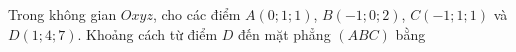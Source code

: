 \begin{ex}
Trong không gian $Oxyz$, cho các điểm $A(0;1;1)$, $B(-1;0;2)$, $C(-1;1;1)$ và $D(1;4;7)$. Khoảng cách từ điểm $D$ đến mặt phẳng $(ABC)$ bằng
\end{ex}
